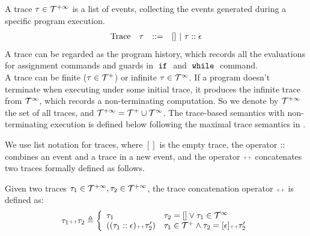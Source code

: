 %
A trace $\mathtt{\tau} \in \mathcal{T}^{+\infty}$ is a list of events, 
collecting the events generated during a specific program execution. 
\[
\begin{array}{llll}
\mbox{Trace} & \mathtt{\tau}
& ::= & [] ~|~ \mathtt{\tau} :: \mathtt{\epsilon} 
\end{array}
\]
A trace can be regarded as the program history, 
which records all the evaluations for assignment commands and guards in $\;\mathtt{if}\;$ and $\;\mathtt{while}\;$ command.
\\
{
A trace can be finite ($\mathtt{\tau} \in \mathcal{T}^{+}$) or infinite $\mathtt{\tau} \in \mathcal{T}^{\infty}$.
If a program doesn't terminate when executing under some initial trace,
it produces the infinite trace 
from $\mathcal{T}^{\infty}$, which records a non-terminating computation.
So we denote by $\mathcal{T}^{+\infty}$ the set of all traces, and $\mathcal{T}^{+\infty} = \mathcal{T}^{+} \cup \mathcal{T}^{\infty}$.
The trace-based semantics with non-terminating execution is defined below following the maximal trace semantics in \cite{Cousot19}.}

We use list notation for traces, where $[]$ is the empty trace, the operator ${\small ::}$ combines an event and a trace in a new event, 
and the operator ${\scriptscriptstyle ++}$ concatenates two traces formally defined as follows. 
\begin{defn}
  \label{def:trace_concate}
Given two traces $\mathtt{\tau}_1 \in \mathcal{T}^{+\infty}, \mathtt{\tau}_2 \in \mathcal{T}^{+\infty}$, the trace concatenation operator 
${\scriptscriptstyle ++}$ is defined as:
\[
\trace_1 \tracecat \trace_2 \triangleq
\left\{
\begin{array}{ll} 
  \trace_1 & \trace_2 = [] \lor \trace_1 \in \inftdom \\
  ((\trace_1 :: \event)  \tracecat \trace_2') & \trace_1 \in \ftdom \land \trace_2 = [\event] \tracecat \trace_2'
\end{array}
\right.
\]
\end{defn}

